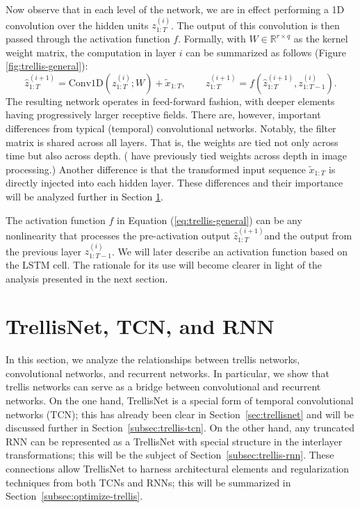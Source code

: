 \documentclass{article} \usepackage{iclr2019_conference,times}
\begin{document}
Now observe that in each level of the network, we are in effect performing a 1D convolution over the hidden units $z_{1:T}^{(i)}$. The output of this convolution is then passed through the activation function $f$. Formally, with $W \in \mathbb{R}^{r \times q}$ as the kernel weight matrix, the computation in layer $i$ can be summarized as follows (Figure \ref{fig:trellis-general}):
\begin{equation}
\label{eq:trellis-general}
\hat{z}_{1:T}^{(i+1)} = \text{Conv1D}\left(z_{1:T}^{(i)}; W\right) + \tilde{x}_{1:T}, \qquad
z_{1:T}^{(i+1)} = f\left(\hat{z}_{1:T}^{(i+1)}, z_{1:T-1}^{(i)}\right).
\end{equation}
The resulting network operates in feed-forward fashion, with deeper elements having progressively larger receptive fields. There are, however, important differences from typical (temporal) convolutional networks. Notably, the filter matrix is shared across all layers. That is, the weights are tied not only across time but also across depth. (\cite{vogel2017primal} have previously tied weights across depth in image processing.) Another difference is that the transformed input sequence $\tilde{x}_{1:T}$ is directly injected into each hidden layer. These differences and their importance will be analyzed further in Section \ref{sec:rnn-tcn-relationship}.

The activation function $f$ in Equation (\ref{eq:trellis-general}) can be any nonlinearity that processes the pre-activation output \small$\hat{z}_{1:T}^{(i+1)}$\normalsize and the output from the previous layer \small$z_{1:T-1}^{(i)}$\normalsize. We will later describe an activation function based on the LSTM cell. The rationale for its use will become clearer in light of the analysis presented in the next section.

\section{TrellisNet, TCN, and RNN}
\label{sec:rnn-tcn-relationship}

In this section, we analyze the relationships between trellis networks, convolutional networks, and recurrent networks.
In particular, we show that trellis networks can serve as a bridge between convolutional and recurrent networks. On the one hand, TrellisNet is a special form of temporal convolutional networks (TCN); this has already been clear in Section~\ref{sec:trellisnet} and will be discussed further in Section~\ref{subsec:trellis-tcn}. On the other hand, any truncated RNN can be represented as a TrellisNet with special structure in the interlayer transformations; this will be the subject of Section~\ref{subsec:trellis-rnn}. These connections allow TrellisNet to harness architectural elements and regularization techniques from both TCNs and RNNs; this will be summarized in Section~\ref{subsec:optimize-trellis}.
\end{document}
